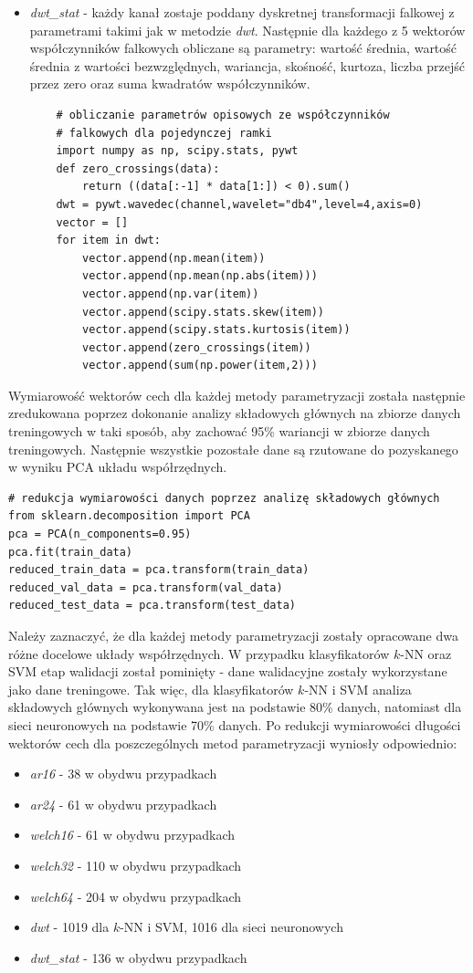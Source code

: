 \documentclass[notitlepage]{report}
\begin{document}
\begin{itemize}
	\item \textit{dwt\_stat} - każdy kanał zostaje poddany dyskretnej transformacji falkowej z parametrami takimi jak w metodzie \textit{dwt}. Następnie dla każdego z 5 wektorów współczynników falkowych obliczane są parametry: wartość średnia, wartość średnia z wartości bezwzględnych,  wariancja, skośność, kurtoza, liczba przejść przez zero oraz suma kwadratów współczynników.
	\begin{lstlisting}
	# obliczanie parametrów opisowych ze współczynników 
	# falkowych dla pojedynczej ramki
	import numpy as np, scipy.stats, pywt
	def zero_crossings(data):
		return ((data[:-1] * data[1:]) < 0).sum()
	dwt = pywt.wavedec(channel,wavelet="db4",level=4,axis=0)
	vector = []
	for item in dwt:
		vector.append(np.mean(item))
		vector.append(np.mean(np.abs(item)))
		vector.append(np.var(item))
		vector.append(scipy.stats.skew(item))
		vector.append(scipy.stats.kurtosis(item))
		vector.append(zero_crossings(item))
		vector.append(sum(np.power(item,2)))
	\end{lstlisting}
\end{itemize}

Wymiarowość wektorów cech dla każdej metody parametryzacji została następnie zredukowana poprzez dokonanie analizy składowych głównych na zbiorze danych treningowych w taki sposób, aby zachować 95\% wariancji w zbiorze danych treningowych. Następnie wszystkie pozostałe dane są rzutowane do pozyskanego w wyniku PCA układu współrzędnych.
\begin{lstlisting}
# redukcja wymiarowości danych poprzez analizę składowych głównych
from sklearn.decomposition import PCA
pca = PCA(n_components=0.95)
pca.fit(train_data)
reduced_train_data = pca.transform(train_data)
reduced_val_data = pca.transform(val_data)
reduced_test_data = pca.transform(test_data)
\end{lstlisting}
Należy zaznaczyć, że dla każdej metody parametryzacji zostały opracowane dwa różne docelowe układy współrzędnych. W przypadku klasyfikatorów $k$-NN oraz SVM etap walidacji został pominięty - dane walidacyjne zostały wykorzystane jako dane treningowe. Tak więc, dla klasyfikatorów $k$-NN i SVM analiza składowych głównych wykonywana jest na podstawie 80\% danych, natomiast dla sieci neuronowych na podstawie 70\% danych. Po redukcji wymiarowości długości wektorów cech dla poszczególnych metod parametryzacji wyniosły odpowiednio: 
\begin{itemize}
	\item \textit{ar16} - 38 w obydwu przypadkach
	\item \textit{ar24} - 61 w obydwu przypadkach
	\item \textit{welch16} - 61 w obydwu przypadkach
	\item \textit{welch32} - 110 w obydwu przypadkach
	\item \textit{welch64} - 204 w obydwu przypadkach
	\item \textit{dwt} - 1019 dla $k$-NN i SVM, 1016 dla sieci neuronowych
	\item \textit{dwt\_stat} - 136 w obydwu przypadkach
\end{itemize}
\end{document}
